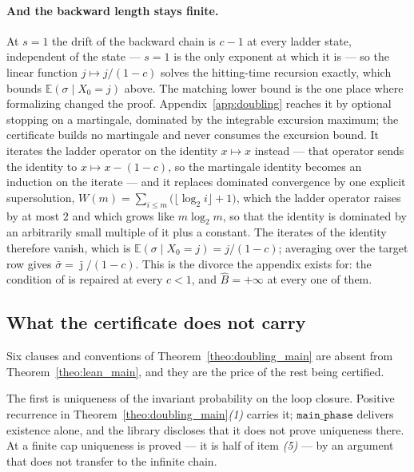 \paragraph{And the backward length stays finite.}
At $s=1$ the drift of the backward chain is $c-1$ at every ladder state, independent of the
state --- $s=1$ is the only exponent at which it is --- so the linear function $j\mapsto j/(1-c)$
solves the hitting-time recursion exactly, which bounds $\mathbb E(\sigma\mid X_0=j)$ above. The
matching lower bound is the one place where formalizing changed the proof.
Appendix~\ref{app:doubling} reaches it by optional stopping on a martingale, dominated by the
integrable excursion maximum; the certificate builds no martingale and never consumes the
excursion bound. It iterates the ladder operator on the identity $x\mapsto x$ instead --- that
operator sends the identity to $x\mapsto x-(1-c)$, so the martingale identity becomes an
induction on the iterate --- and it replaces dominated convergence by one explicit
supersolution, $W(m)=\sum_{i\leq m}\bigl(\lfloor\log_2i\rfloor+1\bigr)$, which the ladder
operator raises by at most $2$ and which grows like $m\log_2m$, so that the identity is
dominated by an arbitrarily small multiple of it plus a constant. The iterates of the identity therefore vanish, which is
$\mathbb E(\sigma\mid X_0=j)=j/(1-c)$; averaging over the target row gives
$\bar\sigma=\bar\jmath/(1-c)$. This is the divorce the appendix exists for: the condition of
\citet{morozov2025revisiting} is repaired at every $c<1$, and $\widehat B=+\infty$ at every one
of them.

\subsection{What the certificate does not carry}\label{sec:lean_scope}

Six clauses and conventions of Theorem~\ref{theo:doubling_main} are absent from
Theorem~\ref{theo:lean_main}, and they are the price of the rest being certified.

The first is uniqueness of the invariant probability on the loop closure. Positive recurrence
in Theorem~\ref{theo:doubling_main}\emph{(1)} carries it; $\texttt{main\_phase}$ delivers
existence alone, and the library discloses that it does not prove uniqueness there. At a finite
cap uniqueness is proved --- it is half of item \emph{(5)} --- by an argument that does not
transfer to the infinite chain.

